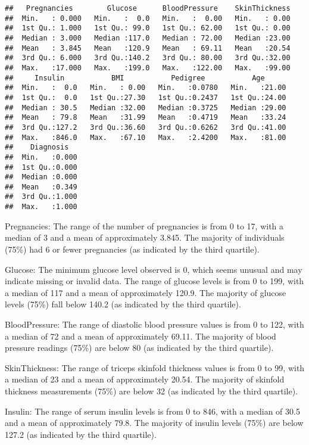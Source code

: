 \documentclass[
]{article}
\begin{document}
\begin{verbatim}
##   Pregnancies        Glucose      BloodPressure    SkinThickness  
##  Min.   : 0.000   Min.   :  0.0   Min.   :  0.00   Min.   : 0.00  
##  1st Qu.: 1.000   1st Qu.: 99.0   1st Qu.: 62.00   1st Qu.: 0.00  
##  Median : 3.000   Median :117.0   Median : 72.00   Median :23.00  
##  Mean   : 3.845   Mean   :120.9   Mean   : 69.11   Mean   :20.54  
##  3rd Qu.: 6.000   3rd Qu.:140.2   3rd Qu.: 80.00   3rd Qu.:32.00  
##  Max.   :17.000   Max.   :199.0   Max.   :122.00   Max.   :99.00  
##     Insulin           BMI           Pedigree           Age       
##  Min.   :  0.0   Min.   : 0.00   Min.   :0.0780   Min.   :21.00  
##  1st Qu.:  0.0   1st Qu.:27.30   1st Qu.:0.2437   1st Qu.:24.00  
##  Median : 30.5   Median :32.00   Median :0.3725   Median :29.00  
##  Mean   : 79.8   Mean   :31.99   Mean   :0.4719   Mean   :33.24  
##  3rd Qu.:127.2   3rd Qu.:36.60   3rd Qu.:0.6262   3rd Qu.:41.00  
##  Max.   :846.0   Max.   :67.10   Max.   :2.4200   Max.   :81.00  
##    Diagnosis    
##  Min.   :0.000  
##  1st Qu.:0.000  
##  Median :0.000  
##  Mean   :0.349  
##  3rd Qu.:1.000  
##  Max.   :1.000
\end{verbatim}

Pregnancies: The range of the number of pregnancies is from 0 to 17,
with a median of 3 and a mean of approximately 3.845. The majority of
individuals (75\%) had 6 or fewer pregnancies (as indicated by the third
quartile).

Glucose: The minimum glucose level observed is 0, which seems unusual
and may indicate missing or invalid data. The range of glucose levels is
from 0 to 199, with a median of 117 and a mean of approximately 120.9.
The majority of glucose levels (75\%) fall below 140.2 (as indicated by
the third quartile).

BloodPressure: The range of diastolic blood pressure values is from 0 to
122, with a median of 72 and a mean of approximately 69.11. The majority
of blood pressure readings (75\%) are below 80 (as indicated by the
third quartile).

SkinThickness: The range of triceps skinfold thickness values is from 0
to 99, with a median of 23 and a mean of approximately 20.54. The
majority of skinfold thickness measurements (75\%) are below 32 (as
indicated by the third quartile).

Insulin: The range of serum insulin levels is from 0 to 846, with a
median of 30.5 and a mean of approximately 79.8. The majority of insulin
levels (75\%) are below 127.2 (as indicated by the third quartile).
\end{document}
